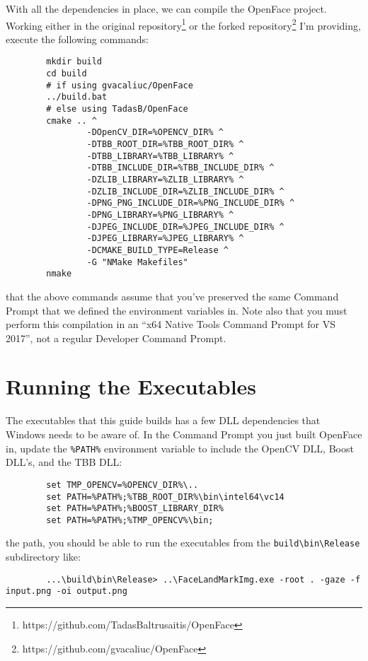 \documentclass{tufte-handout}
\begin{document}
    With all the dependencies in place, we can compile the OpenFace project.  Working
    either in the original repository\footnote{https://github.com/TadasBaltrusaitis/OpenFace} or 
    the forked repository\footnote{https://github.com/gvacaliuc/OpenFace} I'm providing,
    execute the following commands:

    \begin{lstlisting}
        mkdir build
        cd build
        # if using gvacaliuc/OpenFace
        ../build.bat
        # else using TadasB/OpenFace
        cmake .. ^
                -DOpenCV_DIR=%OPENCV_DIR% ^
                -DTBB_ROOT_DIR=%TBB_ROOT_DIR% ^
                -DTBB_LIBRARY=%TBB_LIBRARY% ^
                -DTBB_INCLUDE_DIR=%TBB_INCLUDE_DIR% ^
                -DZLIB_LIBRARY=%ZLIB_LIBRARY% ^
                -DZLIB_INCLUDE_DIR=%ZLIB_INCLUDE_DIR% ^
                -DPNG_PNG_INCLUDE_DIR=%PNG_INCLUDE_DIR% ^
                -DPNG_LIBRARY=%PNG_LIBRARY% ^
                -DJPEG_INCLUDE_DIR=%JPEG_INCLUDE_DIR% ^
                -DJPEG_LIBRARY=%JPEG_LIBRARY% ^
                -DCMAKE_BUILD_TYPE=Release ^
                -G "NMake Makefiles"
        nmake
    \end{lstlisting}

     that the above commands assume that you've preserved the same Command
    Prompt that we defined the environment variables in.  Note also that you must perform this
    compilation in an ``x64 Native Tools Command Prompt for VS 2017'', not a regular Developer
    Command Prompt.

\section{Running the Executables}

    The executables that this guide builds has a few DLL dependencies that Windows needs to
    be aware of.  In the Command Prompt you just built OpenFace in, update the \Verb|%
    environment variable to include the OpenCV DLL, Boost DLL's, and the TBB DLL:

    \begin{lstlisting}
        set TMP_OPENCV=%OPENCV_DIR%\..
        set PATH=%PATH%;%TBB_ROOT_DIR%\bin\intel64\vc14
        set PATH=%PATH%;%BOOST_LIBRARY_DIR%
        set PATH=%PATH%;%TMP_OPENCV%\bin;
    \end{lstlisting}
   
    \break

     the path, you should be able to run the executables from the 
    \Verb|build\bin\Release| subdirectory like:

    \begin{lstlisting}
        ...\build\bin\Release> ..\FaceLandMarkImg.exe -root . -gaze -f input.png -oi output.png
    \end{lstlisting}
\end{document}
